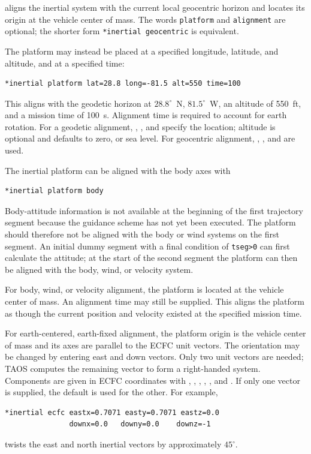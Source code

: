 aligns the inertial system with the current local geocentric horizon and locates its
origin at the vehicle center of mass. The words \texttt{platform} and
\texttt{alignment} are optional; the shorter form \texttt{*inertial geocentric}
is equivalent.

The platform may instead be placed at a specified longitude, latitude, and altitude,
and at a specified time:

\begin{lstlisting}[style=taosmanual]
*inertial platform lat=28.8 long=-81.5 alt=550 time=100
\end{lstlisting}

This aligns with the geodetic horizon at $28.8^\circ$~N, $81.5^\circ$~W, an
altitude of 550~ft, and a mission time of 100~s. Alignment time is required to account
for earth rotation. For a geodetic alignment, , , and
 specify the location; altitude is optional and defaults to zero, or sea
level. For geocentric alignment, , , and
 are used.


The inertial platform can be aligned with the body axes with

\begin{lstlisting}[style=taosmanual]
*inertial platform body
\end{lstlisting}

Body-attitude information is not available at the beginning of the first trajectory
segment because the guidance scheme has not yet been executed. The platform should
therefore not be aligned with the body or wind systems on the first segment. An
initial dummy segment with a final condition of \texttt{tseg>0} can first calculate
the attitude; at the start of the second segment the platform can then be aligned with
the body, wind, or velocity system.

For body, wind, or velocity alignment, the platform is located at the vehicle center of
mass. An alignment time may still be supplied. This aligns the platform as though
the current position and velocity existed at the specified mission time.


For earth-centered, earth-fixed alignment, the platform origin is the vehicle center of
mass and its axes are parallel to the ECFC unit vectors. The orientation may be
changed by entering east and down vectors. Only two unit vectors are needed; TAOS
computes the remaining vector to form a right-handed system. Components are given
in ECFC coordinates with , ,
, , , and
. If only one vector is supplied, the default is used for the other.
For example,

\begin{lstlisting}[style=taosmanual]
*inertial ecfc eastx=0.7071 easty=0.7071 eastz=0.0
               downx=0.0   downy=0.0    downz=-1
\end{lstlisting}

twists the east and north inertial vectors by approximately $45^\circ$.
